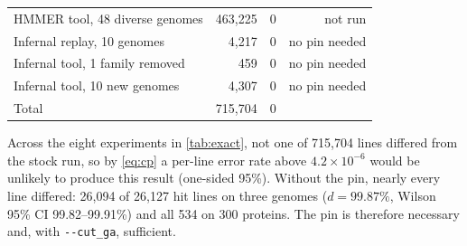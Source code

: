 \documentclass[letterpaper,twocolumn,10pt]{article}
\theoremstyle{definition}
\newcommand{\cutga}{\texttt{-{}-cut\_ga}\xspace}
\begin{document}
\begin{table}[t]
\begin{tabular}{@{}lrcr@{}}
HMMER tool, 48 diverse genomes & 463{,}225 & 0 & not run \\
Infernal replay, 10 genomes & 4{,}217 & 0 & no pin needed \\
Infernal tool, 1 family removed & 459 & 0 & no pin needed \\
Infernal tool, 10 new genomes & 4{,}307 & 0 & no pin needed \\
\midrule
Total & 715{,}704 & 0 & \\
\bottomrule
\end{tabular}
\end{table}

Across the eight experiments in \cref{tab:exact}, not one of 715{,}704 lines differed from the stock run, so by
\cref{eq:cp} a per\nobreakdash-line error rate above $4.2\times10^{-6}$ would be unlikely to produce this result (one\nobreakdash-sided 95\%).
Without the pin, nearly every line differed: 26{,}094 of 26{,}127 hit lines on three genomes ($d = 99.87\%$, Wilson 95\%
CI 99.82--99.91\%) and all 534 on 300 proteins. The pin is therefore necessary and, with \cutga, sufficient.
\end{document}
